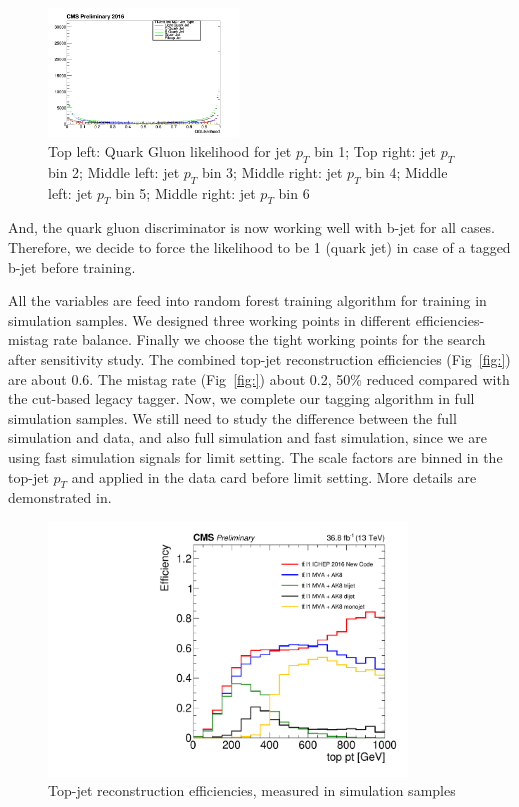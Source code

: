 \begin{figure}[htbp]
\begin{center}
  \includegraphics[width=0.45\textwidth]{sections/mc4/TopTagger/figures/_b_qglikelihoodjetptbin5_.png}
 \end{center}
 \caption{Top left: Quark Gluon likelihood for jet $p_{T}$ bin 1; Top right: jet $p_{T}$ bin 2; Middle left: jet $p_{T}$ bin 3; Middle right: jet $p_{T}$ bin 4; Middle left: jet $p_{T}$ bin 5; Middle right: jet $p_{T}$ bin 6}
 \label{fig:c4ttqgljetpt}
\end{figure}

And, the quark gluon discriminator is now working well with b-jet for all cases. Therefore, we decide to force the likelihood to be 1 (quark jet) in case of a tagged b-jet before training. 

All the variables are feed into random forest\cite{Ho:1995:RDF:844379.844681} training algorithm for training in simulation samples. We designed three working points in different efficiencies-mistag rate balance. Finally we choose the tight working points for the search after sensitivity study. The combined top-jet reconstruction efficiencies (Fig~\ref{fig:}) are about 0.6. The mistag rate (Fig~\ref{fig:}) about 0.2, 50\% reduced compared with the cut-based legacy tagger. Now, we complete our tagging algorithm in full simulation samples. We still need to study the difference between the full simulation and data, and also full simulation and fast simulation, since we are using fast simulation signals for limit setting. The scale factors are binned in the top-jet $p_{T}$ and applied in the data card before limit setting. More details are demonstrated in\cite{AN-16-461}. 

\begin{figure}[htbp]
 \begin{center}
  \includegraphics[width=0.85\textwidth]{sections/mc4/TopTagger/figures/baseline_eff_pt_ttbar1l_tight.pdf}
 \end{center}
 \caption{Top-jet reconstruction efficiencies, measured in \ttbar simulation samples}
 \label{fig:c4ttefftight}
\end{figure}

